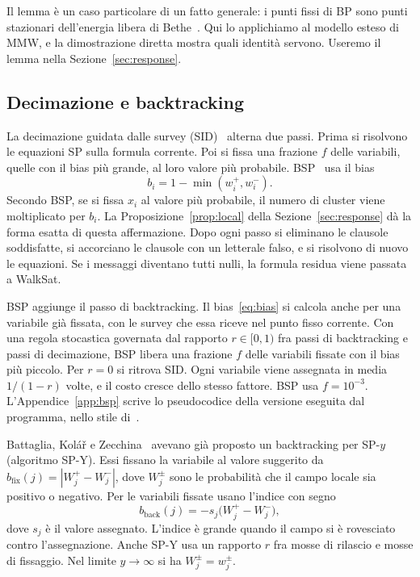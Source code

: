 Il lemma è un caso particolare di un fatto generale: i punti fissi di BP sono punti stazionari dell'energia libera di Bethe~\citep{yedidia2005constructing}.
Qui lo applichiamo al modello esteso di MMW, e la dimostrazione diretta mostra quali identità servono.
Useremo il lemma nella Sezione~\ref{sec:response}.

\subsection{Decimazione e backtracking}

La decimazione guidata dalle survey (SID)~\citep{mezard2002analytic,braunstein2005survey} alterna due passi.
Prima si risolvono le equazioni SP sulla formula corrente.
Poi si fissa una frazione $f$ delle variabili, quelle con il bias più grande, al loro valore più probabile.
BSP~\citep{marino2016bsp} usa il bias
\begin{equation}
b_i=1-\min(w_i^+,w_i^-).
\label{eq:bias}
\end{equation}
Secondo BSP, se si fissa $x_i$ al valore più probabile, il numero di cluster viene moltiplicato per $b_i$.
La Proposizione~\ref{prop:local} della Sezione~\ref{sec:response} dà la forma esatta di questa affermazione.
Dopo ogni passo si eliminano le clausole soddisfatte, si accorciano le clausole con un letterale falso, e si risolvono di nuovo le equazioni.
Se i messaggi diventano tutti nulli, la formula residua viene passata a WalkSat.

BSP aggiunge il passo di backtracking.
Il bias~\eqref{eq:bias} si calcola anche per una variabile già fissata, con le survey che essa riceve nel punto fisso corrente.
Con una regola stocastica governata dal rapporto $r\in[0,1)$ fra passi di backtracking e passi di decimazione, BSP libera una frazione $f$ delle variabili fissate con il bias più piccolo.
Per $r=0$ si ritrova SID.
Ogni variabile viene assegnata in media $1/(1-r)$ volte, e il costo cresce dello stesso fattore.
BSP usa $f=10^{-3}$.
L'Appendice~\ref{app:bsp} scrive lo pseudocodice della versione eseguita dal programma, nello stile di~\citep{cormen2009introduction}.

Battaglia, Kolář e Zecchina~\citep{battaglia2004minimizing} avevano già proposto un backtracking per SP-$y$ (algoritmo SP-Y).
Essi fissano la variabile al valore suggerito da $b_{\mathrm{fix}}(j)=|W_j^+-W_j^-|$, dove $W_j^{\pm}$ sono le probabilità che il campo locale sia positivo o negativo.
Per le variabili fissate usano l'indice con segno
\begin{equation}
b_{\mathrm{back}}(j)=-s_j\bigl(W_j^+-W_j^-\bigr),
\label{eq:bkz-index}
\end{equation}
dove $s_j$ è il valore assegnato.
L'indice è grande quando il campo si è rovesciato contro l'assegnazione.
Anche SP-Y usa un rapporto $r$ fra mosse di rilascio e mosse di fissaggio.
Nel limite $y\to\infty$ si ha $W_j^\pm=w_j^\pm$.

